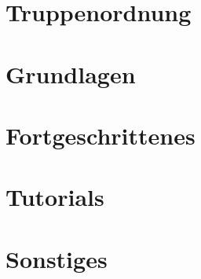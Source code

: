 \documentclass[pdftex,fontsize=12pt,a4paper,numbers=noenddot]{scrreprt}
\begin{document}


\newpage
{} %
\tableofcontents %

\newpage
{} %


\chapter{Truppenordnung}

\newpage

\chapter{Grundlagen}








\newpage

\chapter{Fortgeschrittenes}










\newpage

\chapter{Tutorials}

\newpage

\chapter{Sonstiges}





\cleardoublepage
\appendix
\end{document}
